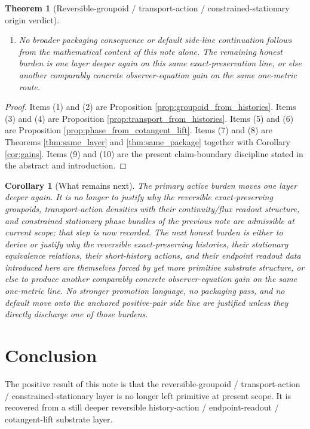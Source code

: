 \documentclass[11pt]{article}
\newtheorem{corollary}{Corollary}
\newtheorem{theorem}{Theorem}
\begin{document}
\begin{theorem}[Reversible-groupoid / transport-action / constrained-stationary origin verdict]
\begin{enumerate}
    \item No broader packaging consequence or default side-line continuation follows from the mathematical content of this note alone. The remaining honest burden is one layer deeper again on this same exact-preservation line, or else another comparably concrete observer-equation gain on the same one-metric route.
\end{enumerate}
\end{theorem}

\begin{proof}
Items (1) and (2) are Proposition \ref{prop:groupoid_from_histories}. Items (3) and (4) are Proposition \ref{prop:transport_from_histories}. Items (5) and (6) are Proposition \ref{prop:phase_from_cotangent_lift}. Items (7) and (8) are Theorems \ref{thm:same_layer} and \ref{thm:same_package} together with Corollary \ref{cor:gains}. Items (9) and (10) are the present claim-boundary discipline stated in the abstract and introduction.
\end{proof}

\begin{corollary}[What remains next]
\label{cor:what_next}
The primary active burden moves one layer deeper again. It is no longer to justify why the reversible exact-preserving groupoids, transport-action densities with their continuity/flux readout structure, and constrained stationary phase bundles of the previous note are admissible at current scope; that step is now recorded. The next honest burden is either to derive or justify why the reversible exact-preserving histories, their stationary equivalence relations, their short-history actions, and their endpoint readout data introduced here are themselves forced by yet more primitive substrate structure, or else to produce another comparably concrete observer-equation gain on the same one-metric line. No stronger promotion language, no packaging pass, and no default move onto the anchored positive-pair side line are justified unless they directly discharge one of those burdens.
\end{corollary}

\section{Conclusion}

The positive result of this note is that the reversible-groupoid / transport-action / constrained-stationary layer is no longer left primitive at present scope. It is recovered from a still deeper reversible history-action / endpoint-readout / cotangent-lift substrate layer.
\end{document}
